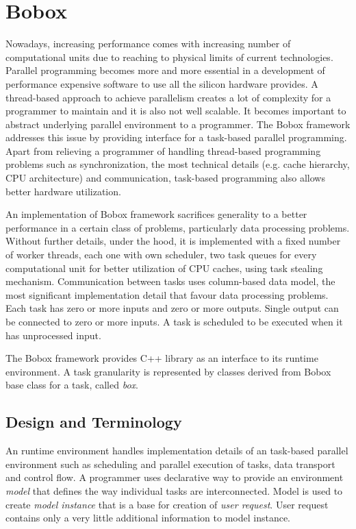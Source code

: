\chapter{Bobox}
Nowadays, increasing performance comes with increasing number of computational units due to reaching to physical limits of current technologies. Parallel programming becomes more and more essential in a development of performance expensive software to use all the silicon hardware provides. A thread-based approach to achieve parallelism creates a lot of complexity for a programmer to maintain and it is also not well scalable. It becomes important to abstract underlying parallel environment to a programmer. The Bobox framework \cite{bobox} addresses this issue by providing interface for a task-based parallel programming. Apart from relieving a programmer of handling thread-based programming problems such as synchronization, the most technical details (e.g. cache hierarchy, CPU architecture) and communication, task-based programming also allows better hardware utilization.

An implementation of Bobox framework sacrifices generality to a better performance in a certain class of problems, particularly data processing problems. Without further details, under the hood, it is implemented with a fixed number of worker threads, each one with own scheduler, two task queues for every computational unit for better utilization of CPU caches, using task stealing mechanism. Communication between tasks uses column-based data model, the most significant implementation detail that favour data processing problems. Each task has zero or more inputs and zero or more outputs. Single output can be connected to zero or more inputs. A task is scheduled to be executed when it has unprocessed input.

The Bobox framework provides C++ library as an interface to its runtime environment. A task granularity is represented by classes derived from Bobox base class for a task, called \emph{box}.

\section{Design and Terminology}
An runtime environment handles implementation details of an task-based parallel environment such as scheduling and parallel execution of tasks, data transport and control flow. A programmer uses declarative way to provide an environment \emph{model} that defines the way individual tasks are interconnected. Model is used to create \emph{model instance} that is a base for creation of \emph{user request}. User request contains only a very little additional information to model instance.

